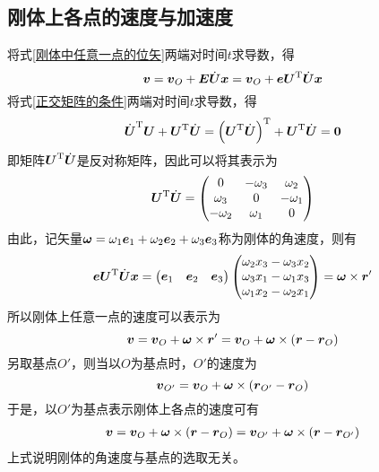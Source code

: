 \subsection{刚体上各点的速度与加速度}
\label{节：刚体上各点的速度与加速度}
将式\eqref{刚体中任意一点的位矢}两端对时间$t$求导数，得
\begin{equation*}
	\boldsymbol{v} = \boldsymbol{v}_O + \boldsymbol{E} \dot{\boldsymbol{U}} \boldsymbol{x} = \boldsymbol{v}_O + \boldsymbol{e} \boldsymbol{U}^{\mathrm{T}} \dot{\boldsymbol{U}} \boldsymbol{x}
\end{equation*}
将式\eqref{正交矩阵的条件}两端对时间$t$求导数，得
\begin{equation*}
	\dot{\boldsymbol{U}}^{\mathrm{T}} \boldsymbol{U} + \boldsymbol{U}^{\mathrm{T}} \dot{\boldsymbol{U}} = \left(\boldsymbol{U}^{\mathrm{T}} \dot{\boldsymbol{U}}\right)^{\mathrm{T}} + \boldsymbol{U}^{\mathrm{T}} \dot{\boldsymbol{U}} = \boldsymbol{0}
\end{equation*}
即矩阵$\boldsymbol{U}^{\mathrm{T}} \dot{\boldsymbol{U}}$是反对称矩阵，因此可以将其表示为
\begin{equation*}
	\boldsymbol{U}^{\mathrm{T}} \dot{\boldsymbol{U}} = \begin{pmatrix} 0 & -\omega_3 & \omega_2 \\ \omega_3 & 0 & -\omega_1 \\ -\omega_2 & \omega_1 & 0 \end{pmatrix}
\end{equation*}
由此，记矢量$\boldsymbol{\omega} = \omega_1 \boldsymbol{e}_1 + \omega_2 \boldsymbol{e}_2 + \omega_3 \boldsymbol{e}_3$称为刚体的{\heiti 角速度}，则有
\begin{equation*}
	\boldsymbol{e} \boldsymbol{U}^{\mathrm{T}} \dot{\boldsymbol{U}} \boldsymbol{x} = \begin{pmatrix} \boldsymbol{e}_1 & \boldsymbol{e}_2 & \boldsymbol{e}_3 \end{pmatrix} \begin{pmatrix} \omega_2 x_3 - \omega_3 x_2 \\ \omega_3 x_1 - \omega_1 x_3 \\ \omega_1 x_2 - \omega_2 x_1 \end{pmatrix} = \boldsymbol{\omega} \times \boldsymbol{r}'
\end{equation*}
所以刚体上任意一点的速度可以表示为
\begin{equation}
	\boldsymbol{v} = \boldsymbol{v}_O + \boldsymbol{\omega} \times \boldsymbol{r}' = \boldsymbol{v}_O + \boldsymbol{\omega} \times (\boldsymbol{r}-\boldsymbol{r}_O)
	\label{刚体上任意一点的速度}
\end{equation}
另取基点$O'$，则当以$O$为基点时，$O'$的速度为
\begin{equation*}
	\boldsymbol{v}_{O'} = \boldsymbol{v}_O + \boldsymbol{\omega} \times (\boldsymbol{r}_{O'} - \boldsymbol{r}_O)
\end{equation*}
于是，以$O'$为基点表示刚体上各点的速度可有
\begin{align*}
	\boldsymbol{v} = \boldsymbol{v}_O + \boldsymbol{\omega} \times (\boldsymbol{r}-\boldsymbol{r}_O) = \boldsymbol{v}_{O'} + \boldsymbol{\omega} \times (\boldsymbol{r}-\boldsymbol{r}_{O'})
\end{align*}
上式说明{\heiti 刚体的角速度与基点的选取无关}。

